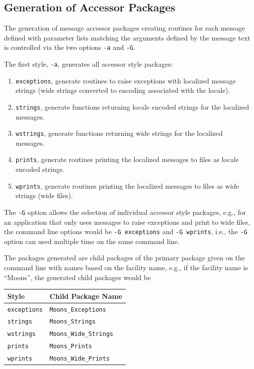 \subsection{Generation of Accessor Packages}

The generation of message accessor packages creating routines for each
message defined with parameter lists matching the arguments defined by the
message text is controlled via the two options \verb|-a| and \verb|-G|.

The first style, \verb|-a|, generates all accessor style packages:
\begin{enumerate}
\item \verb|exceptions|, generate routines to raise exceptions with localized
     message strings (wide strings converted to encoding associated with the
     locale).
\item \verb|strings|, generate functions returning locale encoded strings for
      the localized messages.
\item \verb|wstrings|, generate functions returning wide strings for the
     localized messages.
\item \verb|prints|, generate routines printing the localized messages to
     files as locale encoded strings.
\item \verb|wprints|, generate routines printing the localized messages to
     files as wide strings (wide files).
\end{enumerate}

The \verb|-G| option allows the selection of individual accessor style
packages, e.g., for an application that only uses messages to raise
exceptions and print to wide files, the command line options would be
\verb|-G exceptions| and \verb|-G wprints|, i.e., the \verb|-G| option
can used multiple time on the same command line.

The packages generated are child packages of the primary package given on
the command line with names based on the facility name, e.g., if the
facility name is ``Moons'', the generated child packages would be
\begin{center}
\begin{tabular}{ll}
Style & Child Package Name\\\hline
\verb|exceptions| & \verb|Moons_Exceptions|\\
\verb|strings|    & \verb|Moons_Strings|\\
\verb|wstrings|   & \verb|Moons_Wide_Strings|\\
\verb|prints|     & \verb|Moons_Prints|\\
\verb|wprints|    & \verb|Moons_Wide_Prints|
\end{tabular}
\end{center}

